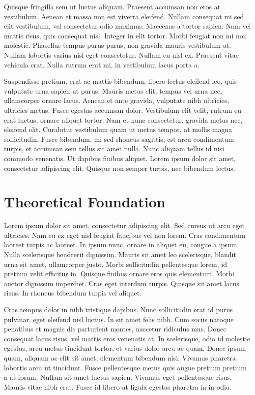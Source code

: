 \documentclass[a4paper,11pt]{kth-mag}
\begin{document}
Quisque fringilla sem ut luctus aliquam. Praesent accumsan non eros at vestibulum. Aenean et massa non est viverra eleifend. Nullam consequat mi sed elit vestibulum, vel consectetur odio maximus. Maecenas a tortor sapien. Nam vel mattis risus, quis consequat nisl. Integer in elit tortor. Morbi feugiat non mi non molestie. Phasellus tempus purus purus, non gravida mauris vestibulum at. Nullam lobortis varius nisl eget consectetur. Nullam eu nisl ex. Praesent vitae vehicula erat. Nulla rutrum erat mi, in vestibulum lacus porta a.

Suspendisse pretium, erat ac mattis bibendum, libero lectus eleifend leo, quis vulputate urna sapien ut purus. Mauris metus elit, tempus vel urna nec, ullamcorper ornare lacus. Aenean et ante gravida, vulputate nibh ultricies, ultricies metus. Fusce egestas accumsan dolor. Vestibulum elit velit, rutrum eu erat luctus, ornare aliquet tortor. Nam et nunc consectetur, gravida metus nec, eleifend elit. Curabitur vestibulum quam ut metus tempor, at mollis magna sollicitudin. Fusce bibendum, mi sed rhoncus sagittis, est arcu condimentum turpis, et accumsan sem tellus sit amet nulla. Nunc aliquam tellus id nisi commodo venenatis. Ut dapibus finibus aliquet. Lorem ipsum dolor sit amet, consectetur adipiscing elit. Quisque non semper turpis, nec bibendum lectus.

\chapter{Theoretical Foundation}

Lorem ipsum dolor sit amet, consectetur adipiscing elit. Sed cursus ut arcu eget ultricies. Nam eu ex eget nisl feugiat faucibus vel non lorem. Cras condimentum laoreet turpis ac laoreet. In ipsum nunc, ornare in aliquet eu, congue a ipsum. Nulla scelerisque hendrerit dignissim. Mauris sit amet leo scelerisque, blandit urna sit amet, ullamcorper justo. Morbi sollicitudin pellentesque lorem, id pretium velit efficitur in. Quisque finibus ornare eros quis elementum. Morbi auctor dignissim imperdiet. Cras eget interdum turpis. Quisque sit amet lacus risus. In rhoncus bibendum turpis vel aliquet.

Cras tempus dolor in nibh tristique dapibus. Nunc sollicitudin erat id purus pulvinar, eget eleifend nisl luctus. In sit amet felis nibh. Cum sociis natoque penatibus et magnis dis parturient montes, nascetur ridiculus mus. Donec consequat lacus risus, vel mattis eros venenatis at. In scelerisque, odio id molestie egestas, arcu metus tincidunt tortor, et varius dolor arcu ac quam. Donec ipsum quam, aliquam ac elit sit amet, elementum bibendum nisi. Vivamus pharetra lobortis arcu ut tincidunt. Fusce pellentesque metus quis augue pretium pretium a at ipsum. Nullam sit amet luctus sapien. Vivamus eget pellentesque risus. Mauris vitae nibh erat. Fusce id libero at ligula egestas pharetra in in odio.
\end{document}
